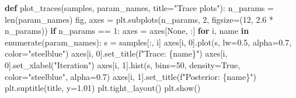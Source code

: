 \documentclass[
  letterpaper,
  DIV=11,
  numbers=noendperiod]{scrartcl}
\newenvironment{Shaded}{\begin{snugshade}}{\end{snugshade}}
\newcommand{\BuiltInTok}[1]{\textcolor[rgb]{0.00,0.23,0.31}{#1}}
\newcommand{\ControlFlowTok}[1]{\textcolor[rgb]{0.00,0.23,0.31}{\textbf{#1}}}
\newcommand{\DecValTok}[1]{\textcolor[rgb]{0.68,0.00,0.00}{#1}}
\newcommand{\FloatTok}[1]{\textcolor[rgb]{0.68,0.00,0.00}{#1}}
\newcommand{\KeywordTok}[1]{\textcolor[rgb]{0.00,0.23,0.31}{\textbf{#1}}}
\newcommand{\NormalTok}[1]{\textcolor[rgb]{0.00,0.23,0.31}{#1}}
\newcommand{\OperatorTok}[1]{\textcolor[rgb]{0.37,0.37,0.37}{#1}}
\newcommand{\SpecialCharTok}[1]{\textcolor[rgb]{0.37,0.37,0.37}{#1}}
\newcommand{\SpecialStringTok}[1]{\textcolor[rgb]{0.13,0.47,0.30}{#1}}
\newcommand{\StringTok}[1]{\textcolor[rgb]{0.13,0.47,0.30}{#1}}
\newcommand{\VariableTok}[1]{\textcolor[rgb]{0.07,0.07,0.07}{#1}}
\begin{document}
\begin{Shaded}
\begin{Highlighting}[]
\KeywordTok{def}\NormalTok{ plot\_traces(samples, param\_names, title}\OperatorTok{=}\StringTok{"Trace plots"}\NormalTok{):}
\NormalTok{    n\_params }\OperatorTok{=} \BuiltInTok{len}\NormalTok{(param\_names)}
\NormalTok{    fig, axes }\OperatorTok{=}\NormalTok{ plt.subplots(n\_params, }\DecValTok{2}\NormalTok{, figsize}\OperatorTok{=}\NormalTok{(}\DecValTok{12}\NormalTok{, }\FloatTok{2.6} \OperatorTok{*}\NormalTok{ n\_params))}
    \ControlFlowTok{if}\NormalTok{ n\_params }\OperatorTok{==} \DecValTok{1}\NormalTok{:}
\NormalTok{        axes }\OperatorTok{=}\NormalTok{ axes[}\VariableTok{None}\NormalTok{, :]}
    \ControlFlowTok{for}\NormalTok{ i, name }\KeywordTok{in} \BuiltInTok{enumerate}\NormalTok{(param\_names):}
\NormalTok{        s }\OperatorTok{=}\NormalTok{ samples[:, i]}
\NormalTok{        axes[i, }\DecValTok{0}\NormalTok{].plot(s, lw}\OperatorTok{=}\FloatTok{0.5}\NormalTok{, alpha}\OperatorTok{=}\FloatTok{0.7}\NormalTok{, color}\OperatorTok{=}\StringTok{"steelblue"}\NormalTok{)}
\NormalTok{        axes[i, }\DecValTok{0}\NormalTok{].set\_title(}\SpecialStringTok{f"Trace: }\SpecialCharTok{\{}\NormalTok{name}\SpecialCharTok{\}}\SpecialStringTok{"}\NormalTok{)}
\NormalTok{        axes[i, }\DecValTok{0}\NormalTok{].set\_xlabel(}\StringTok{"Iteration"}\NormalTok{)}
\NormalTok{        axes[i, }\DecValTok{1}\NormalTok{].hist(s, bins}\OperatorTok{=}\DecValTok{50}\NormalTok{, density}\OperatorTok{=}\VariableTok{True}\NormalTok{, color}\OperatorTok{=}\StringTok{"steelblue"}\NormalTok{, alpha}\OperatorTok{=}\FloatTok{0.7}\NormalTok{)}
\NormalTok{        axes[i, }\DecValTok{1}\NormalTok{].set\_title(}\SpecialStringTok{f"Posterior: }\SpecialCharTok{\{}\NormalTok{name}\SpecialCharTok{\}}\SpecialStringTok{"}\NormalTok{)}
\NormalTok{    plt.suptitle(title, y}\OperatorTok{=}\FloatTok{1.01}\NormalTok{)}
\NormalTok{    plt.tight\_layout()}
\NormalTok{    plt.show()}


\end{Highlighting}
\end{Shaded}
\end{document}
